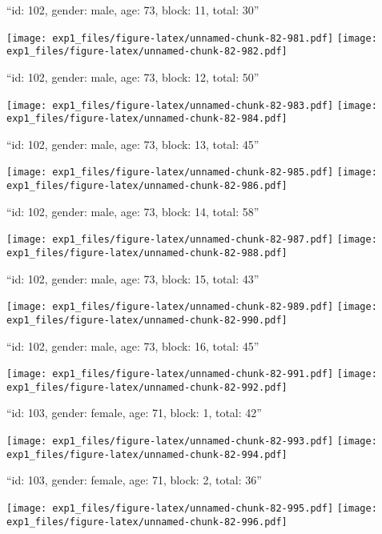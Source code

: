 \documentclass[11pt,,]{article}
\begin{document}
\newpage
[1] 

``id: 102, gender: male, age: 73, block: 11, total: 30''

\texttt{[image: exp1\_files/figure-latex/unnamed-chunk-82-981.pdf]}
\texttt{[image: exp1\_files/figure-latex/unnamed-chunk-82-982.pdf]}

\newpage
[1] 

``id: 102, gender: male, age: 73, block: 12, total: 50''

\texttt{[image: exp1\_files/figure-latex/unnamed-chunk-82-983.pdf]}
\texttt{[image: exp1\_files/figure-latex/unnamed-chunk-82-984.pdf]}

\newpage
[1] 

``id: 102, gender: male, age: 73, block: 13, total: 45''

\texttt{[image: exp1\_files/figure-latex/unnamed-chunk-82-985.pdf]}
\texttt{[image: exp1\_files/figure-latex/unnamed-chunk-82-986.pdf]}

\newpage
[1] 

``id: 102, gender: male, age: 73, block: 14, total: 58''

\texttt{[image: exp1\_files/figure-latex/unnamed-chunk-82-987.pdf]}
\texttt{[image: exp1\_files/figure-latex/unnamed-chunk-82-988.pdf]}

\newpage
[1] 

``id: 102, gender: male, age: 73, block: 15, total: 43''

\texttt{[image: exp1\_files/figure-latex/unnamed-chunk-82-989.pdf]}
\texttt{[image: exp1\_files/figure-latex/unnamed-chunk-82-990.pdf]}

\newpage
[1] 

``id: 102, gender: male, age: 73, block: 16, total: 45''

\texttt{[image: exp1\_files/figure-latex/unnamed-chunk-82-991.pdf]}
\texttt{[image: exp1\_files/figure-latex/unnamed-chunk-82-992.pdf]}

\newpage
[1] 

``id: 103, gender: female, age: 71, block: 1, total: 42''

\texttt{[image: exp1\_files/figure-latex/unnamed-chunk-82-993.pdf]}
\texttt{[image: exp1\_files/figure-latex/unnamed-chunk-82-994.pdf]}

\newpage
[1] 

``id: 103, gender: female, age: 71, block: 2, total: 36''

\texttt{[image: exp1\_files/figure-latex/unnamed-chunk-82-995.pdf]}
\texttt{[image: exp1\_files/figure-latex/unnamed-chunk-82-996.pdf]}
\end{document}
